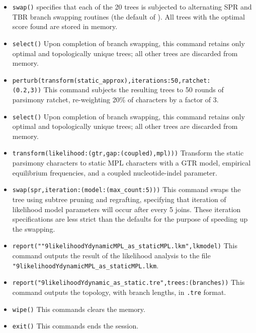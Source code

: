 \begin{itemize}
\item \texttt{swap()}  specifies that each of the 20 trees is subjected to alternating SPR and TBR branch swapping routines (the default of \poy). All trees with the optimal score found are stored in memory.
\item \texttt{select()} Upon completion of branch swapping, this command retains only optimal and topologically unique trees; all other trees are discarded from memory. 
\item \texttt{perturb(transform(static\_approx),iterations:50,ratchet:\\(0.2,3))} This command subjects the resulting trees to 50 rounds of parsimony ratchet, re-weighting 20\% of characters by a factor of 3.
\item \texttt{select()} Upon completion of branch swapping, this command retains only optimal and topologically unique trees; all other trees are discarded from memory. 
\item \texttt{transform(likelihood:(gtr,gap:(coupled),mpl)))} Transform the static parsimony characters to static MPL characters with a GTR model, empirical equilibrium frequencies, and a coupled nucleotide-indel parameter.
\item \texttt{swap(spr,iteration:(model:(max\_count:5)))} This command swaps the tree using subtree pruning and regrafting, specifying that iteration of likelihood model parameters will occur after every 5 joins. These iteration specifications are less strict than the defaults for the purpose of speeding up the swapping.
\item \texttt{report(""9likelihoodYdynamicMPL\_as\_staticMPL.lkm",lkmodel)} This command outputs the result of the likelihood analysis to the file \texttt{"9likelihoodYdynamicMPL\_as\_staticMPL.lkm}.
\item \texttt{report("9likelihoodYdynamic\_as\_static.tre",trees:(branches))} This command outputs the topology, with branch lengths, in \texttt{.tre} format.
\item \texttt{wipe()} This commands clears the memory.
\item \texttt{exit()} This commands ends the \poy session.
\end{itemize}
